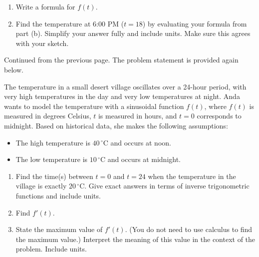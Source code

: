 \documentclass{article}
\begin{document}
\begin{enumerate}
\begin{enumerate}[topsep=0pt]
    \item Write a formula for $f(t)$.
    
    \item Find the temperature at 6:00 PM ($t = 18$) by evaluating your formula from part (b). Simplify your answer fully and include units. Make sure this agrees with your sketch.

    \pspace{\newpage}

    \end{enumerate}

\begin{framed}
        Continued from the previous page. The problem statement is provided again below.
    
   The temperature in a small desert village oscillates over a 24-hour period, with very high temperatures in the day and very low temperatures at night. Anda wants to model the temperature with a sinusoidal function $f(t)$, where $f(t)$ is measured in degrees Celsius, $t$ is measured in hours, and $t=0$ corresponds to midnight. Based on historical data, she makes the following assumptions: 
\begin{itemize}[nosep]
    \item The high temperature is $40\,^\circ$C and occurs at noon.
    \item The low temperature is $10\,^\circ$C and occurs at midnight.
\end{itemize} 
    \end{framed}

    \begin{enumerate}[resume]

    \item Find the time(s) between $t=0$ and $t=24$ when the temperature in the village is exactly $20\,^\circ$C. Give exact answers in terms of inverse trigonometric functions and include units.

    \item Find $f'(t)$. 



    \item State the maximum value of $f'(t)$. (You do not need to use calculus to find the maximum value.) Interpret the meaning of this value in the context of the problem. Include units.

\end{enumerate}


\end{enumerate}
\end{document}
